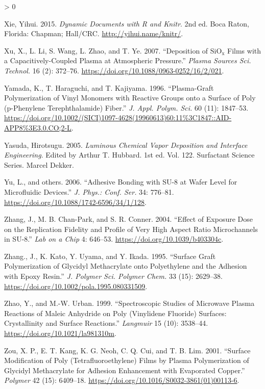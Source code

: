 \documentclass[
  10pt,
  twoside]{article}
\newlength{\cslhangindent}
\newenvironment{CSLReferences}[2] %
 {%
  \setlength{\parindent}{0pt}
  \ifodd #1 \everypar{\setlength{\hangindent}{\cslhangindent}}\ignorespaces\fi
  \ifnum #2 > 0
  \setlength{\parskip}{#2\baselineskip}
  \fi
 }%
 {}
\begin{document}
\begin{CSLReferences}{1}{0}
\leavevmode\hypertarget{ref-xie2015}{}%
Xie, Yihui. 2015. \emph{Dynamic Documents with {R} and Knitr}. 2nd ed. Boca Raton, Florida: Chapman; Hall/CRC. \url{http://yihui.name/knitr/}.

\leavevmode\hypertarget{ref-Xu07}{}%
Xu, X., L. Li, S. Wang, L. Zhao, and T. Ye. 2007. {``Deposition of \(\mathrm{SiO_x}\) Films with a Capacitively-Coupled Plasma at Atmospheric Pressure.''} \emph{Plasma Sources Sci. Technol.} 16 (2): 372--76. \url{https://doi.org/10.1088/0963-0252/16/2/021}.

\leavevmode\hypertarget{ref-Yama1996}{}%
Yamada, K., T. Haraguchi, and T. Kajiyama. 1996. {``Plasma-Graft Polymerization of Vinyl Monomers with Reactive Groups onto a Surface of Poly (p-Phenylene Terephthalamide) Fiber.''} \emph{J. Appl. Polym. Sci.} 60 (11): 1847--53. \url{https://doi.org/10.1002/(SICI)1097-4628(19960613)60:11\%3C1847::AID-APP8\%3E3.0.CO;2-L}.

\leavevmode\hypertarget{ref-Yasu05}{}%
Yasuda, Hirotsugu. 2005. \emph{Luminous Chemical Vapor Deposition and Interface Engineering}. Edited by Arthur T. Hubbard. 1st ed. Vol. 122. Surfactant Science Series. Marcel Dekker.

\leavevmode\hypertarget{ref-Yu06}{}%
Yu, L., and others. 2006. {``Adhesive Bonding with SU-8 at Wafer Level for Microfluidic Devices.''} \emph{J. Phys.: Conf. Ser.} 34: 776--81. \url{https://doi.org/10.1088/1742-6596/34/1/128}.

\leavevmode\hypertarget{ref-Zhan04}{}%
Zhang, J., M. B. Chan-Park, and S. R. Conner. 2004. {``Effect of Exposure Dose on the Replication Fidelity and Profile of Very High Aspect Ratio Microchannels in {SU-8}.''} \emph{Lab on a Chip} 4: 646--53. \url{https://doi.org/10.1039/b403304c}.

\leavevmode\hypertarget{ref-Zhan1995}{}%
Zhang., J., K. Kato, Y. Uyama, and Y. Ikada. 1995. {``Surface Graft Polymerization of Glycidyl Methacrylate onto Polyethylene and the Adhesion with Epoxy Resin.''} \emph{J. Polymer Sci. Polymer Chem.} 33 (15): 2629--38. \url{https://doi.org/10.1002/pola.1995.080331509}.

\leavevmode\hypertarget{ref-Zhao1999}{}%
Zhao, Y., and M.-W. Urban. 1999. {``Spectroscopic Studies of Microwave Plasma Reactions of Maleic Anhydride on Poly (Vinylidene Fluoride) Surfaces: Crystallinity and Surface Reactions.''} \emph{Langmuir} 15 (10): 3538--44. \url{https://doi.org/10.1021/la981310m}.

\leavevmode\hypertarget{ref-Zou01}{}%
Zou, X. P., E. T. Kang, K. G. Neoh, C. Q. Cui, and T. B. Lim. 2001. {``Surface Modification of Poly (Tetrafluoroethylene) Films by Plasma Polymerization of Glycidyl Methacrylate for Adhesion Enhancement with Evaporated Copper.''} \emph{Polymer} 42 (15): 6409--18. \url{https://doi.org/10.1016/S0032-3861(01)00113-6}.

\end{CSLReferences}
\end{document}
